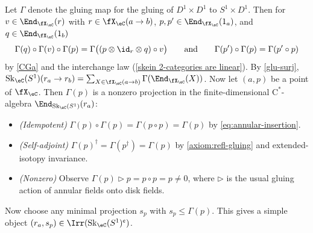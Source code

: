 \documentclass[12pt,reqno]{amsart}
\newcommand{\Sk}{\mathrm{Sk}}
\newcommand{\C}{\eC}
\newcommand{\Cstar}{\ensuremath{\mathrm{C}^{*}}}
\newcommand{\cent}{\textup{\textcent}}
\begin{document}
\begin{remark} 
\label{pointsconnect}
Let $\Gamma$ denote the gluing map for the gluing of $D^1\times D^1$ to $S^1\times D^1$. Then for $v\in\End_{\fX_\C}(r)$ with $r\in\fX_\C(a\to b)$, $p,p'\in\End_{\fX_\C}(1_a)$, and $q\in\End_{\fX_\C}(1_b)$
\begin{equation} 
\label{eq:annular-insertion}
\Gamma(q)\circ\Gamma(v)\circ\Gamma(p)=\Gamma\big((p\otimes\id_r\otimes q)\circ v\big)\qquad\text{and}\qquad \Gamma(p')\circ\Gamma(p)=\Gamma(p'\circ p) 
\end{equation}
by \ref{CGa} and the interchange law (\cref{skein 2-categories are linear}). By \cref{glu-surj}, $\Sk_\C(S^1)(r_a\to r_b)=\sum_{X\in\fX_\C(a\to b)}\Gamma(\End_{\fX_\C}(X))$. Now let $(a,p)$ be a point of $\fX_\C$. Then $\Gamma(p)$ is a nonzero projection in the finite-dimensional $\Cstar$-algebra $\End_{\Sk_\C(S^1)}(r_a)$:
\begin{itemize} 
\item\emph{(Idempotent)} $\Gamma(p)\circ\Gamma(p)=\Gamma(p\circ p)=\Gamma(p)$ by \eqref{eq:annular-insertion}.
\item \emph{(Self-adjoint)} $\Gamma(p)^\dag=\Gamma(p^\dag)=\Gamma(p)$ by \ref{axiom:refl-gluing} and extended-isotopy invariance.
\item \emph{(Nonzero)} Observe $\Gamma(p)\triangleright p = p\circ p = p\neq 0$, where $\triangleright$ is the usual gluing action of annular fields onto disk fields.
\end{itemize}
Now choose any minimal projection $s_p$ with $s_{p}\leq\Gamma(p)$. This gives a simple object $(r_a,s_p)\in\Irr(\Sk_\C(S^1)^\cent)$.
\end{remark}
\end{document}
